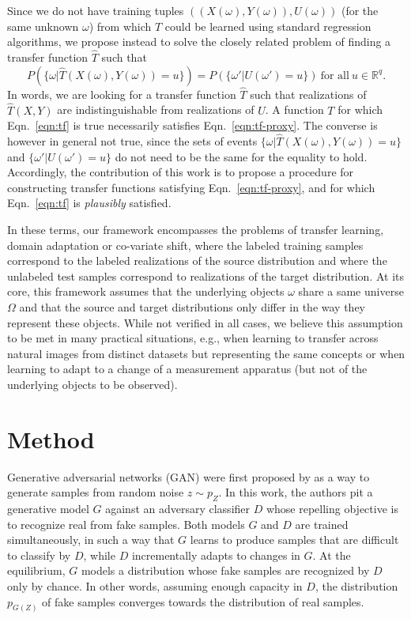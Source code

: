 \documentclass{article}
\theoremstyle{plain}
\begin{document}
Since we do not have training tuples $((X(\omega), Y(\omega)), U(\omega))$ (for the same
unknown $\omega$) from which $T$ could be learned using standard regression
algorithms, we propose instead to solve the closely related problem of
finding a transfer function $\hat T$ such that
\begin{equation}\label{eqn:tf-proxy}
P(\{ \omega | \hat T(X(\omega), Y(\omega)) = u \}) = P(\{ \omega' | U(\omega') = u \}) ~\text{for all}~ u \in \mathbb{R}^q.
\end{equation}
In words, we are looking for a transfer function $\hat T$ such that realizations
of $\hat T(X,Y)$ are indistinguishable from realizations of $U$. A function $T$ for
which Eqn.~\ref{eqn:tf} is true necessarily satisfies Eqn.~\ref{eqn:tf-proxy}.
The converse is however in general not true, since the sets of events $\{ \omega |
\hat T(X(\omega), Y(\omega)) = u \}$ and $\{ \omega' | U(\omega') = u \}$ do not need to be
the same for the equality to hold. Accordingly, the contribution of this work is
to propose a procedure for constructing transfer functions satisfying
Eqn.~\ref{eqn:tf-proxy}, and for which Eqn.~\ref{eqn:tf} is {\it plausibly}
satisfied.

In these terms, our framework encompasses the problems of transfer learning,
domain adaptation or co-variate shift, where the labeled training samples
correspond to the labeled realizations of the source distribution and where the
unlabeled test samples correspond to realizations of the target distribution. At
its core, this framework assumes that the underlying objects $\omega$ share a
same universe $\Omega$ and that the source and target distributions only differ
in the way they represent these objects. While not verified in all cases, we
believe this assumption to be met in many practical situations, e.g., when
learning to transfer across natural images from distinct datasets but
representing the same concepts or when learning to adapt to a change of a
measurement apparatus (but not of the underlying objects to be observed).



\section{Method}

Generative adversarial networks (GAN) were first proposed by
\cite{goodfellow2014generative} as a way to generate samples from random noise
$z \sim p_Z$. In this work, the authors pit a generative model $G$ against an
adversary classifier $D$ whose repelling objective is to recognize real from
fake samples. Both models $G$ and $D$ are trained simultaneously, in such a way
that $G$ learns to produce samples that are difficult to classify by $D$, while
$D$ incrementally adapts to changes in $G$. At the equilibrium, $G$ models a
distribution whose fake samples are recognized by $D$ only by chance. In other
words, assuming enough capacity in $D$, the distribution $p_{G(Z)}$ of fake
samples converges towards the distribution of real samples.
\end{document}
